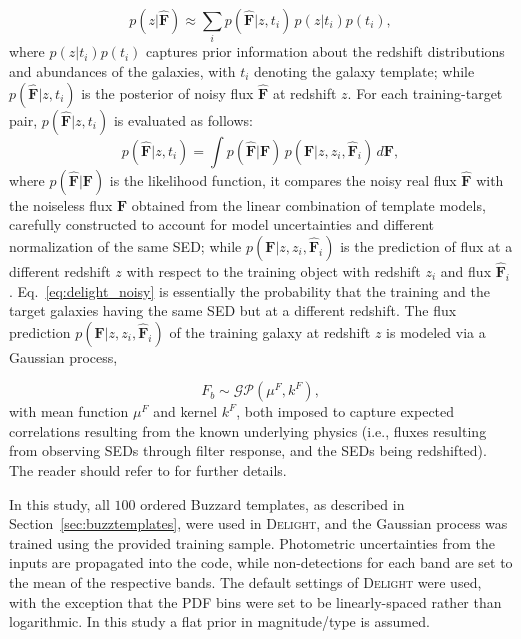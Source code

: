 \begin{equation}
p(z|\mathbf{\hat{F}}) \approx \sum_i p(\mathbf{\hat{F}}|z,t_i)\, p(z|t_i)p(t_i),
\end{equation}
\noindent where $p(z|t_i)p(t_i)$ captures prior information about the redshift distributions and abundances of the galaxies, with $t_i$ denoting the galaxy template; while $p(\mathbf{\hat{F}}|z,t_i)$ is the posterior of noisy flux $\mathbf{\hat{F}}$ at redshift $z$.
For each training-target pair, $p(\mathbf{\hat{F}}|z,t_i)$ is evaluated as follows:
\begin{equation} \label{eq:delight_noisy}
p(\mathbf{\hat{F}}|z,t_i) = \int p(\mathbf{\hat{F}}|\mathbf{F})\, p(\mathbf{F}|z,z_i,\mathbf{\hat{F}}_i)\, d\mathbf{F},
\end{equation}
where $p(\mathbf{\hat{F}}|\mathbf{F})$ is the likelihood function, it compares the noisy real flux $\mathbf{\hat{F}}$ with the noiseless flux $\mathbf{F}$ obtained from the linear combination of template models, carefully constructed to account for model uncertainties and different normalization of the same SED; while $p(\mathbf{F}|z,z_i,\mathbf{\hat{F}}_i)$ is the prediction of flux at a different redshift $z$ with respect to the training object with redshift $z_i$ and flux $\mathbf{\hat{F}}_i$. Eq.~\ref{eq:delight_noisy} is essentially the probability that the training and the target galaxies having the same SED but at a different redshift.
The flux prediction $p(\mathbf{F}|z,z_i,\mathbf{\hat{F}}_i)$ of the training galaxy at redshift $z$ is modeled via a Gaussian process,

\begin{equation} \label{eq:delight_gp}
F_b \sim \mathcal{GP}\left( \mu^F,k^F \right),
\end{equation}
\noindent with mean function $\mu^F$ and kernel $k^F$, both imposed to capture expected correlations resulting from the known underlying physics (i.e., fluxes resulting from observing SEDs through filter response, and the SEDs being redshifted).
The reader should refer to \citet{Leistedt:17} for further details.

In this study, all $100$ ordered Buzzard templates, as described in Section~\ref{sec:buzztemplates}, were used in \textsc{Delight}, and the Gaussian process was trained using the provided training sample.
Photometric uncertainties from the inputs are propagated into the code, while non-detections for each band are set to the mean of the respective bands.
The default settings of \textsc{Delight} were used, with the exception that the PDF bins were set to be linearly-spaced rather than logarithmic. In this study a flat prior in magnitude/type is assumed.

